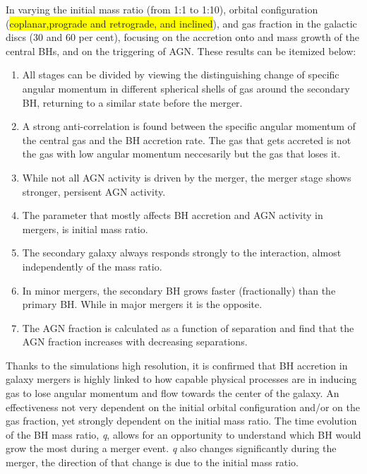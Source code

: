 \documentclass{article}
\begin{document}
\par  In varying the initial mass ratio (from 1:1 to 1:10), orbital configuration (\colorbox{yellow}{coplanar,prograde and retrograde, and inclined}), and gas fraction in the galactic discs (30 and 60 per cent), focusing on the accretion onto and mass growth of the central BHs, and on the triggering of AGN. These results can be itemized below:
\begin{enumerate}
	\item All stages can be divided by viewing the distinguishing change of specific angular momentum in different spherical shells of gas around the secondary BH, returning to a similar state before the merger.
	\item A strong anti-correlation is found between the specific angular momentum of the central gas and the BH accretion rate. The gas that gets accreted is not the gas with low angular momentum neccesarily but the gas that loses it.
	\item While not all AGN activity is driven by the merger, the merger stage shows stronger, persisent AGN activity.
	\item The parameter that mostly affects BH accretion and AGN activity in mergers, is initial mass ratio.
	\item The secondary galaxy always responds strongly to the interaction, almost independently of the mass ratio.
	\item In minor mergers, the secondary BH grows faster (fractionally) than the primary BH. While in major mergers it is the opposite.
	\item The AGN fraction is calculated as a function of separation and find that the AGN fraction increases with decreasing separations.
\end{enumerate}
\par  Thanks to the simulations high resolution, it is confirmed that BH accretion in galaxy mergers is highly linked to how capable physical processes are in inducing gas to lose angular momentum and flow towards the center of the galaxy. An effectiveness not very dependent on the initial orbital configuration and/or on the gas fraction, yet strongly dependent on the initial mass ratio. The time evolution of the BH mass ratio, \textit{q}, allows for an opportunity to understand which BH would grow the most during a merger event. \textit{q} also changes significantly during the merger, the direction of that change is due to the initial mass ratio.
\end{document}
